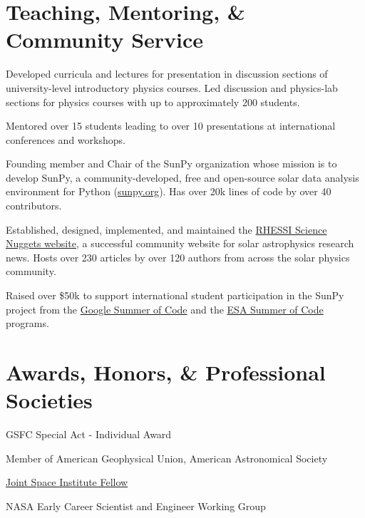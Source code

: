 \documentclass[11pt]{article}
\begin{document}
\section{Teaching, Mentoring, \& Community Service}
\begin{itemize*}
\item Developed curricula and lectures for presentation in discussion sections of university-level introductory physics courses. Led discussion and physics-lab sections for physics courses with up to approximately 200 students.
\item Mentored over 15 students leading to over 10 presentations at international conferences and workshops.
\item Founding member and Chair of the SunPy organization whose mission is to develop SunPy, a community-developed, free and open-source solar data analysis environment for Python (\url{sunpy.org}). Has over 20k lines of code by over 40 contributors.
\item Established, designed, implemented, and maintained the \href{http://sprg.ssl.berkeley.edu/~tohban/wiki/index.php/RHESSI_Science_Nuggets}{RHESSI Science Nuggets website}, a successful community website for solar astrophysics research news. Hosts over 230 articles by over 120 authors from across the solar physics community.
\item Raised over \$50k to support international student participation in the SunPy project from the \href{https://developers.google.com/open-source/soc/}{Google Summer of Code} and the \href{http://sophia.estec.esa.int/socis2014/}{ESA Summer of Code} programs.
\end{itemize*}

\section{Awards, Honors, \& Professional Societies}
\begin{itemize*}
\item GSFC Special Act - Individual Award
\item Member of American Geophysical Union, American Astronomical Society
\item \href{https://jsi.astro.umd.edu}{Joint Space Institute Fellow}
\item NASA Early Career Scientist and Engineer Working Group
\end{itemize*}
\nocite{*}


\end{document}
